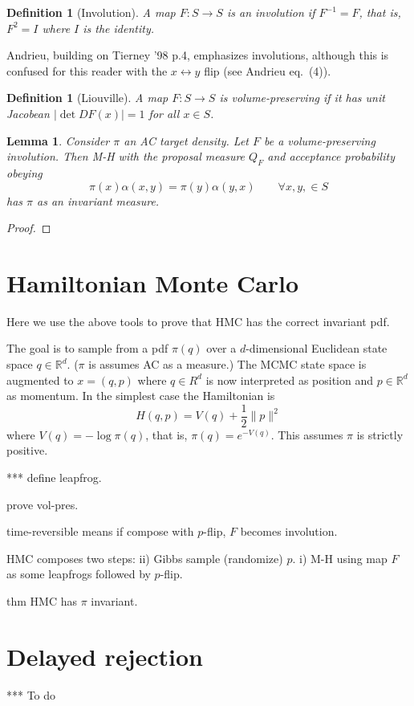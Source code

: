 \documentclass[10pt]{article}
\newcommand{\be}{\begin{equation}}
\newcommand{\ee}{\end{equation}}
\newcommand{\R}{\mathbb{R}}
\newtheorem{lem}[thm]{Lemma}
\newtheorem{dfn}[thm]{Definition}
\newcommand{\al}{\alpha}
\begin{document}
\begin{dfn}[Involution]
  A map $F:S\to S$ is an involution if $F^{-1} = F$,
  that is, $F^2=I$ where $I$ is the identity.
\end{dfn}
Andrieu, building on Tierney '98 p.4, emphasizes involutions,
although this is confused for this reader with the $x\leftrightarrow y$ flip
(see Andrieu eq.~(4)).

\begin{dfn}[Liouville]
  A map $F:S\to S$ is volume-preserving if it has unit Jacobean
  $|\det DF(x)| = 1$ for all $x\in S$.
\end{dfn}

\begin{lem}
  Consider $\pi$ an AC target density.
  Let $F$ be a volume-preserving involution.
  Then M-H with the proposal measure $Q_F$ and acceptance
  probability obeying
  \be
  \pi(x) \al(x,y) = \pi(y) \al(y,x)   \qquad \forall x,y, \in S
  \label{alrats}
  \ee
  has $\pi$ as an invariant measure.
\end{lem}
\begin{proof}


\end{proof}



\section{Hamiltonian Monte Carlo}

Here we use the above tools to prove that HMC has the correct invariant pdf.

The goal is to sample from a pdf $\pi(q)$ over a $d$-dimensional
Euclidean state space $q\in \R^d$. ($\pi$ is assumes AC as a measure.)
The MCMC state space is augmented to $x = (q,p)$ where $q\in R^d$ is now interpreted
as position and $p\in\R^d$ as momentum.
In the simplest case the Hamiltonian is
$$
H(q,p) = V(q) + \frac{1}{2}\|p\|^2
$$
where $V(q) = -\log \pi(q)$, that is, $\pi(q) = e^{-V(q)}$.
This assumes $\pi$ is strictly positive.

*** define leapfrog.

prove vol-pres.

time-reversible means if compose with $p$-flip, $F$ becomes involution.

HMC composes two steps:
ii) Gibbs sample (randomize) $p$.
i) M-H using map $F$ as some leapfrogs followed by $p$-flip.

thm HMC has $\pi$ invariant.




\section{Delayed rejection}

*** To do







\end{document}
